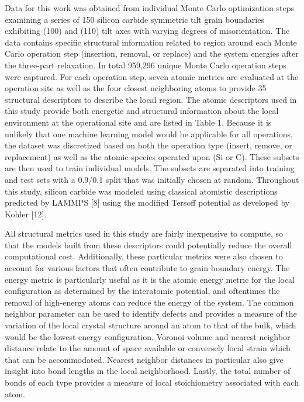 \documentclass[aip,reprint,longbibliography,amsmath,amssymb,twocolumn,superscriptaddress]{revtex4-1}
\begin{document}
Data for this work was obtained from individual Monte Carlo optimization steps examining a series of 150 silicon carbide symmetric tilt grain boundaries exhibiting (100) and (110) tilt axes with varying degrees of misorientation.   
%
The data contains specific structural information related to region around each Monte Carlo operation step (insertion, removal, or replace) and the system energies after the three-part relaxation.   
%
In total 959,296 unique Monte Carlo operation steps were captured.  
%
For each operation step, seven atomic metrics are evaluated at the operation site as well as the four closest neighboring atoms to provide 35 structural descriptors to describe the local region.  
%
The atomic descriptors used in this study provide both energetic and structural information about the local environment at the operational site and are listed in Table 1.  
%
Because it is unlikely that one machine learning model would be applicable for all operations, the dataset was discretized based on both the operation type (insert, remove, or replacement) as well as the atomic species operated upon (Si or C). 
%
These subsets are then used to train individual models. 
%
The subsets are separated into training and test sets with a 0.9/0.1 split that was initially chosen at random.  
%
Throughout this study, silicon carbide was modeled using classical atomistic descriptions predicted by LAMMPS [8] using the modified Tersoff potential as developed by Kohler [12].


All structural metrics used in this study are fairly inexpensive to compute, so that the models built from these descriptors could potentially reduce the overall computational cost.  
%
Additionally, these particular metrics were also chosen to account for various factors that often contribute to grain boundary energy.  
%
The energy metric is particularly useful as it is the atomic energy metric for the local configuration as determined by the interatomic potential, and oftentimes the removal of high-energy atoms can reduce the energy of the system. 
%
The common neighbor parameter can be used to identify defects and provides a measure of the variation of the local crystal structure around an atom to that of the bulk, which would be the lowest energy configuration.  
%
Voronoi volume and nearest neighbor distance relate to the amount of space available or conversely local strain which that can be accommodated. 
%
Nearest neighbor distances in particular also give insight into bond lengths in the local neighborhood.  Lastly, the total number of bonds of each type provides a measure of local stoichiometry associated with each atom. 
\end{document}
